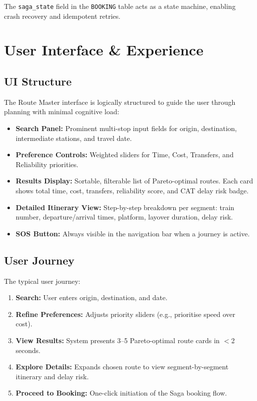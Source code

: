 \documentclass[12pt,a4paper]{report}
\begin{document}
The \texttt{saga\_state} field in the \texttt{BOOKING} table acts as a state machine, enabling crash recovery and idempotent retries.

\chapter{User Interface \& Experience}

\section{UI Structure}

The Route Master interface is logically structured to guide the user through planning with minimal cognitive load:

\begin{itemize}[leftmargin=1.5em]
  \item \textbf{Search Panel:} Prominent multi-stop input fields for origin, destination, intermediate stations, and travel date.
  \item \textbf{Preference Controls:} Weighted sliders for Time, Cost, Transfers, and Reliability priorities.
  \item \textbf{Results Display:} Sortable, filterable list of Pareto-optimal routes. Each card shows total time, cost, transfers, reliability score, and CAT delay risk badge.
  \item \textbf{Detailed Itinerary View:} Step-by-step breakdown per segment: train number, departure/arrival times, platform, layover duration, delay risk.
  \item \textbf{SOS Button:} Always visible in the navigation bar when a journey is active.
\end{itemize}

\section{User Journey}

The typical user journey:

\begin{enumerate}[leftmargin=1.5em]
  \item \textbf{Search:} User enters origin, destination, and date.
  \item \textbf{Refine Preferences:} Adjusts priority sliders (e.g., prioritise speed over cost).
  \item \textbf{View Results:} System presents 3--5 Pareto-optimal route cards in $<$2 seconds.
  \item \textbf{Explore Details:} Expands chosen route to view segment-by-segment itinerary and delay risk.
  \item \textbf{Proceed to Booking:} One-click initiation of the Saga booking flow.
\end{enumerate}
\end{document}
